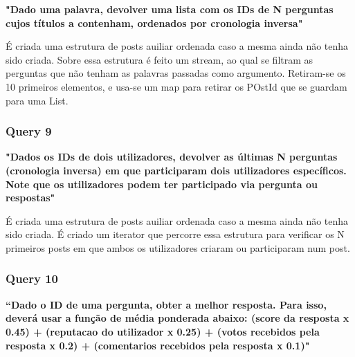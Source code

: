 \documentclass[a4paper]{article}
\begin{document}
\textbf{"Dado uma palavra, devolver uma lista com os IDs de
N perguntas cujos títulos a contenham, ordenados por cronologia inversa"}

\vspace{0.1cm}

É criada uma estrutura de posts auiliar ordenada caso a mesma ainda não tenha
sido criada.
Sobre essa estrutura é feito um stream, ao qual se filtram as perguntas
que não tenham as palavras passadas como argumento. Retiram-se os 10 primeiros
elementos, e usa-se um map para retirar os POstId que se guardam para uma List.



\subsubsection*{Query 9}
\label{sec:query9}

\textbf{"Dados os IDs de dois utilizadores, devolver as últimas
N perguntas (cronologia inversa) em que participaram dois utilizadores específicos.
Note que os utilizadores podem ter participado via pergunta ou respostas"}

\vspace{0.1cm}

É criada uma estrutura de posts auiliar ordenada caso a mesma ainda não tenha
sido criada.
É criado um iterator que percorre essa estrutura para verificar os N primeiros
posts em que ambos os utilizadores criaram ou participaram num post.

\subsubsection*{Query 10}
\label{sec:query10}

\textbf{“Dado o ID de uma pergunta, obter a melhor resposta.
Para isso, deverá usar a função de média ponderada abaixo: (score da resposta x 0.45)
+ (reputacao do utilizador x 0.25) + (votos recebidos pela resposta x 0.2) +
(comentarios recebidos pela resposta x 0.1)"}\par

\vspace{0.1cm}
\end{document}
